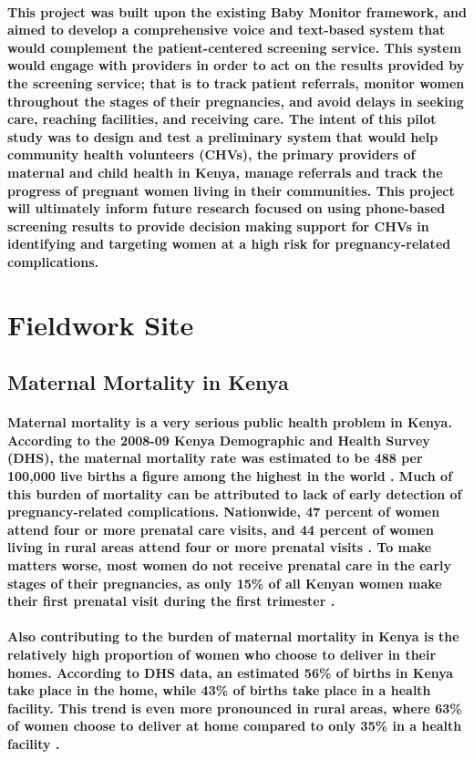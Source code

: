 \paragraph{This project was built upon the existing Baby Monitor framework, and aimed to develop a comprehensive voice and text-based system that would complement the patient-centered screening service. This system would engage with providers in order to act on the results provided by the screening service; that is to track patient referrals, monitor women throughout the stages of their pregnancies, and avoid delays in seeking care, reaching facilities, and receiving care. The intent of this pilot study was to design and test a preliminary system that would help community health volunteers (CHVs), the primary providers of maternal and child health in Kenya, manage referrals and track the progress of pregnant women living in their communities. This project will ultimately inform future research focused on using phone-based screening results to provide decision making support for CHVs in identifying and targeting women at a high risk for pregnancy-related complications.}

\section{Fieldwork Site}
\subsection{Maternal Mortality in Kenya}
\paragraph{Maternal mortality is a very serious public health problem in Kenya. According to the 2008-09 Kenya Demographic and Health Survey (DHS), the maternal mortality rate was estimated to be 488 per 100,000 live births \textemdash a figure among the highest in the world \citep{DHS2010}. Much of this burden of mortality can be attributed to lack of early detection of pregnancy-related complications. Nationwide, 47 percent of women attend four or more prenatal care visits, and 44 percent of women living in rural areas attend four or more prenatal visits \citep{DHS2010}. To make matters worse, most women do not receive prenatal care in the early stages of their pregnancies, as only 15\% of all Kenyan women make their first prenatal visit during the first trimester \citep{DHS2010}.}

\paragraph{Also contributing to the burden of maternal mortality in Kenya is the relatively high proportion of women who choose to deliver in their homes. According to DHS data, an estimated 56\% of births in Kenya take place in the home, while 43\% of births take place in a health facility. This trend is even more pronounced in rural areas, where 63\% of women choose to deliver at home compared to only 35\% in a health facility \citep{DHS2010}.}

